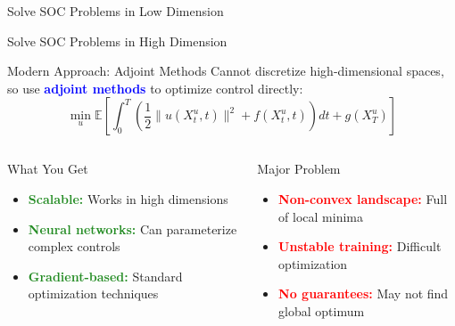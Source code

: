 \documentclass[aspectratio=169,xcolor=dvipsnames]{beamer}
\begin{document}
\begin{frame}{Solve SOC Problems in Low Dimension}
\end{frame}

\begin{frame}{Solve SOC Problems in High Dimension}
    \vspace{-0.1cm}
    
    \begin{block}{Modern Approach: Adjoint Methods}
        Cannot discretize high-dimensional spaces, so use \textcolor{blue}{\textbf{adjoint methods}} to optimize control directly:
        \begin{equation}
        \min_{u} \mathbb{E}\left[\int_0^T \left(\frac{1}{2}\|u(X_t^u, t)\|^2 + f(X_t^u, t)\right) dt + g(X_T^u)\right]
        \end{equation}
    \end{block}

    \vspace{-0.4cm}

    \begin{columns}[t]
        \begin{block}{What You Get}
            \begin{itemize}
                \item \textcolor{ForestGreen}{\textbf{Scalable:}} Works in high dimensions
                \item \textcolor{ForestGreen}{\textbf{Neural networks:}} Can parameterize complex controls
                \item \textcolor{ForestGreen}{\textbf{Gradient-based:}} Standard optimization techniques
            \end{itemize}
        \end{block}
        
        \begin{alertblock}{Major Problem}
            \begin{itemize}
                \item \textcolor{red}{\textbf{Non-convex landscape:}} Full of local minima
                \item \textcolor{red}{\textbf{Unstable training:}} Difficult optimization
                \item \textcolor{red}{\textbf{No guarantees:}} May not find global optimum
            \end{itemize}
        \end{alertblock}
    \end{columns}
\end{frame}
\end{document}
